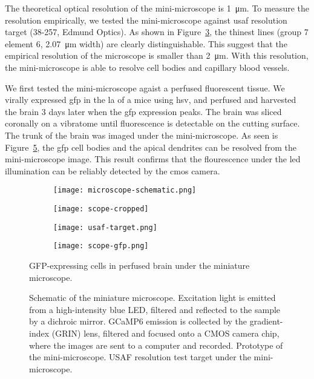 The theoretical optical resolution of the mini-microscope is \SI{1}{\um}. To measure the resolution empirically, we tested the mini-microscope against \gls{usaf} resolution target (38-257, Edmund Optics). As shown in Figure~\ref{f.usaf}, the thinest lines (group 7 element 6, \SI{2.07}{\um} width) are clearly distinguishable. This suggest that the empirical resolution of the microscope is smaller than \SI{2}{\um}. With this resolution, the mini-microscope is able to resolve cell bodies and capillary blood vessels.

We first tested the mini-microscope agaist a perfused fluorescent tissue. We virally expressed \gls{gfp} in the \gls{la} of a mice using \gls{hsv}, and perfused and harvested the brain 3 days later when the \gls{gfp} expression peaks. The brain was sliced coronally on a vibratome until fluorescence is detectable on the cutting surface. The trunk of the brain was imaged under the mini-microscope. As seen is Figure~\ref{f.scope-gfp}, the \gls{gfp} cell bodies and the apical dendrites can be resolved from the mini-microscope image. This result confirms that the flourescence under the \gls{led} illumination can be reliably detected by the \gls{cmos} camera.

\begin{figure}[h]
    \begin{subfigure}[t]{.55\textwidth}
        \centering
        \texttt{[image: microscope-schematic.png]}
        \caption{\label{f.scope-schema}}
    \end{subfigure}
    \begin{subfigure}[t]{.45\textwidth}
        \centering
        \texttt{[image: scope-cropped]}
        \caption{\label{f.scope}}
    \end{subfigure}
    \begin{subfigure}[t]{.5\textwidth}
        \centering
        \texttt{[image: usaf-target.png]}
        \caption{\label{f.usaf}}
    \end{subfigure}
    \begin{subfigure}[t]{.5\textwidth}
        \centering
        \texttt{[image: scope-gfp.png]}
        \caption{\label{f.scope-gfp}}
    \end{subfigure}
    \caption{ Schematic of the miniature microscope. Excitation light is emitted from a high-intensity blue LED, filtered and reflected to the sample by a dichroic mirror. GCaMP6 emission is collected by the gradient-index (GRIN) lens, filtered and focused onto a CMOS camera chip, where the images are sent to a computer and recorded. 
              Prototype of the mini-microscope.
              USAF resolution test target under the mini-microscope.}
              GFP-expressing cells in perfused brain under the miniature microscope.
\end{figure}


